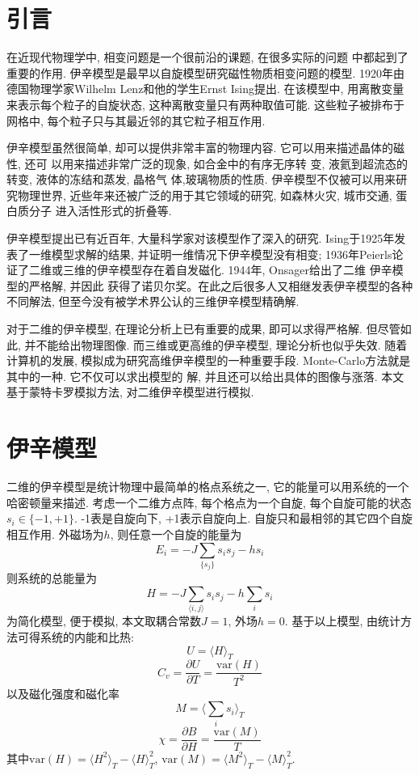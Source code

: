 \documentclass[11pt,a4paper,boxed]{caspset}
\begin{document}
\section{引言}
在近现代物理学中, 相变问题是一个很前沿的课题, 在很多实际的问题
中都起到了重要的作用.
伊辛模型是最早以自旋模型研究磁性物质相变问题的模型. 1920年由德国物理学家Wilhelm Lenz和他的学生Ernst Ising提出. 在该模型中, 用离散变量来表示每个粒子的自旋状态, 这种离散变量只有两种取值可能. 这些粒子被排布于网格中, 每个粒子只与其最近邻的其它粒子相互作用.

伊辛模型虽然很简单, 却可以提供非常丰富的物理内容. 它可以用来描述晶体的磁性, 还可
以用来描述非常广泛的现象, 如合金中的有序无序转
变, 液氦到超流态的转变, 液体的冻结和蒸发, 晶格气
体,玻璃物质的性质. 伊辛模型不仅被可以用来研究物理世界, 近些年来还被广泛的用于其它领域的研究, 如森林火灾, 城市交通, 蛋白质分子
进入活性形式的折叠等.

伊辛模型提出已有近百年, 大量科学家对该模型作了深入的研究. Ising于1925年发表了一维模型求解的结果, 并证明一维情况下伊辛模型没有相变; 1936年Peierls论
证了二维或三维的伊辛模型存在着自发磁化. 1944年, Onsager给出了二维
伊辛模型的严格解, 并因此
获得了诺贝尔奖。在此之后很多人又相继发表伊辛模型的各种不同解法, 但至今没有被学术界公认的三维伊辛模型精确解.

对于二维的伊辛模型, 在理论分析上已有重要的成果, 即可以求得严格解.
但尽管如此, 并不能给出物理图像. 而三维或更高维的伊辛模型, 理论分析也似乎失效.
随着计算机的发展, 模拟成为研究高维伊辛模型的一种重要手段.
Monte-Carlo方法就是其中的一种. 它不仅可以求出模型的
解, 并且还可以给出具体的图像与涨落. 本文基于蒙特卡罗模拟方法, 对二维伊辛模型进行模拟.

\section{伊辛模型}
二维的伊辛模型是统计物理中最简单的格点系统之一, 它的能量可以用系统的一个哈密顿量来描述. 考虑一个二维方点阵,
每个格点为一个自旋, 每个自旋可能的状态$s_i\in\{-1, +1\}$. -1表是自旋向下, +1表示自旋向上. 自旋只和最相邻的其它四个自旋相互作用. 外磁场为$h$, 则任意一个自旋的能量为
\[
E_i = - J\sum_{\{s_j\}}s_is_j - hs_i
\]
则系统的总能量为
\[
H = - J\sum_{\langle i,j \rangle}s_is_j - h\sum_{i}s_i
\]
为简化模型, 便于模拟, 本文取耦合常数$J=1$, 外场$h=0$. 基于以上模型, 由统计方法可得系统的内能和比热:
\begin{equation}
U = \langle H \rangle_T
\end{equation}
\begin{equation}
C_v = \frac{\partial U}{\partial T} = \frac{\mathrm{var}(H)}{T^2}
\end{equation}
以及磁化强度和磁化率
\begin{equation}
M = \langle \sum_i s_i \rangle_T
\end{equation}
\begin{equation}
\chi = \frac{\partial B}{\partial H} = \frac{\mathrm{var}(M)}{T}
\end{equation}
其中$\mathrm{var}(H)=\langle H^2\rangle_T-\langle H \rangle_T^2$, $\mathrm{var}(M)=\langle M^2\rangle_T-\langle M \rangle_T^2$.
\end{document}
